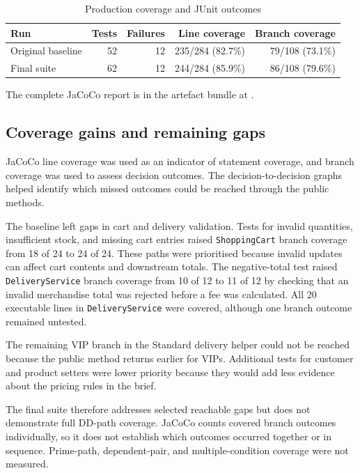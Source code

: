\begin{table}[htbp]
    \centering
    \caption{Production coverage and JUnit outcomes}
    \label{tab:coverage}
    \begin{tabular}{@{}lrrrr@{}}
        \toprule
        Run & Tests & Failures & Line coverage & Branch coverage \\
        \midrule
        Original baseline & 52 & 12 & 235/284 (82.7\%) & 79/108 (73.1\%) \\
        Final suite & 62 & 12 & 244/284 (85.9\%) & 86/108 (79.6\%) \\
        \bottomrule
    \end{tabular}
\end{table}

The complete JaCoCo report is in the artefact bundle at
.

\subsection{Coverage gains and remaining gaps}
JaCoCo line coverage was used as an indicator of statement coverage,
and branch coverage was used to assess decision outcomes. The
decision-to-decision graphs helped identify which missed outcomes could
be reached through the public methods.

The baseline left gaps in cart and delivery validation. Tests for
invalid quantities, insufficient stock, and missing cart entries raised
\texttt{ShoppingCart} branch coverage from 18 of 24 to 24 of 24. These
paths were prioritised because invalid updates can affect cart contents
and downstream totals. The negative-total test raised
\texttt{DeliveryService} branch coverage from 10 of 12 to 11 of 12 by
checking that an invalid merchandise total was rejected before a fee
was calculated. All 20 executable lines in \texttt{DeliveryService}
were covered, although one branch outcome remained untested.

The remaining VIP branch in the Standard delivery helper could not be
reached because the public method returns earlier for VIPs. Additional
tests for customer and product setters were lower priority because they
would add less evidence about the pricing rules in the brief.

The final suite therefore addresses selected reachable gaps but does
not demonstrate full DD-path coverage. JaCoCo counts covered branch
outcomes individually, so it does not establish which outcomes occurred
together or in sequence. Prime-path, dependent-pair, and
multiple-condition coverage were not measured.


